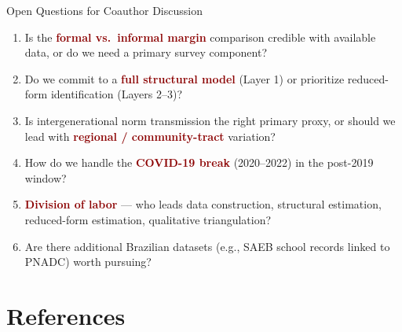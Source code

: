 \documentclass[aspectratio=169,10pt]{beamer}
\newcommand{\hl}[1]{\textcolor{darkred}{\textbf{#1}}}
\begin{document}
\begin{frame}{Open Questions for Coauthor Discussion}
    \begin{enumerate}
        \item Is the \hl{formal vs.\ informal margin} comparison credible with available data, or do we need a primary survey component?
        \item Do we commit to a \hl{full structural model} (Layer 1) or prioritize reduced-form identification (Layers 2--3)?
        \item Is intergenerational norm transmission the right primary proxy, or should we lead with \hl{regional / community-tract} variation?
        \item How do we handle the \hl{COVID-19 break} (2020--2022) in the post-2019 window?
        \item \hl{Division of labor} --- who leads data construction, structural estimation, reduced-form estimation, qualitative triangulation?
        \item Are there additional Brazilian datasets (e.g., SAEB school records linked to PNADC) worth pursuing?
    \end{enumerate}
\end{frame}



\section*{References}
\end{document}
